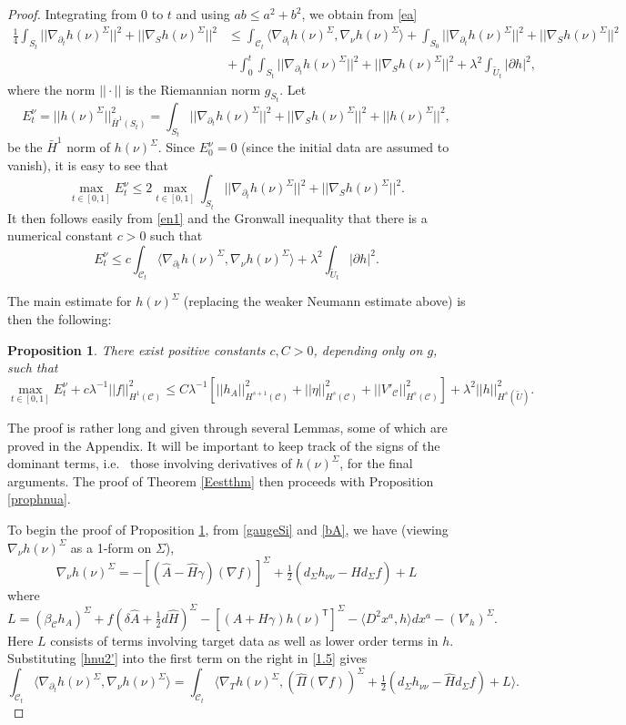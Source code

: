 \documentclass[10pt]{amsart}
\renewcommand{\b}{\beta}
\newcommand{\g}{\gamma}
\renewcommand{\d}{\delta}
\newcommand{\Si}{\Sigma}
\renewcommand{\l}{\lambda}
\newcommand{\cC}{{\mathcal C}}
\newcommand{\tT}{\mathsf{T}}
\newcommand{\be}{\begin{equation}}
\newcommand{\ee}{\end{equation}}
\newcommand{\p}{\partial}
\renewcommand{\hat}{\widehat}
\newcommand{\<}{\langle}
\renewcommand{\>}{\rangle}
\newcommand{\w}{\widetilde}
\theoremstyle{plain}
\newtheorem{proposition}[lemma]{Proposition}
\theoremstyle{remark}
\theoremstyle{definition}
\numberwithin{equation}{section}
\begin{document}
\begin{proof}
 Integrating from $0$ to $t$ and using $ab \leq a^2 + b^2$, we obtain from \eqref{ea} 
\be \label{en1}
\begin{split}
\tfrac{1}{4}\int_{S_t}||\nabla_{\p_t} h(\nu)^{\Si}||^2  +  ||\nabla_S h(\nu)^{\Si}||^2 & \leq \int_{\cC_t}\<\nabla_{\p_t} h(\nu)^{\Si}, \nabla_{\nu}h(\nu)^{\Si}\> 
+ \int_{S_0} ||\nabla_{\p_t} h(\nu)^{\Si}||^2 + ||\nabla_S h(\nu)^{\Si}||^2 \\
& + \int_{0}^t \int_{S_t}||\nabla_{\p_t} h(\nu)^{\Si}||^2 + ||\nabla_S h(\nu)^{\Si}||^2 + \l^2 \int_{\w U_t} |\p h|^2 ,
\end{split}
\ee
where the norm $|| \cdot ||$ is the Riemannian norm $g_{S_t}$. Let 
\be \label{edef}
E_t^{\nu} = ||h(\nu)^{\Si}||_{\bar H^1(S_t)}^2 = \int_{S_t}||\nabla_{\p_t} h(\nu)^{\Si}||^2 + ||\nabla_S h(\nu)^{\Si}||^2 + ||h(\nu)^{\Si}||^2,
\ee
be the $\bar H^1$ norm of $h(\nu)^{\Si}$. Since $E_0^{\nu} = 0$ (since the initial data are assumed to vanish), it is easy to see that 
$$\max_{t\in [0,1]}E_t^{\nu} \leq 2 \max_{t\in [0,1]} \int_{S_t}||\nabla_{\p_t} h(\nu)^{\Si}||^2 + ||\nabla_S h(\nu)^{\Si}||^2.$$ 
It then follows easily from \eqref{en1} and the Gronwall inequality that there is a numerical constant $c > 0$ such that 
\be \label{1.5}
E_t^{\nu} \leq  c \int_{\cC_t}\<\nabla_{\p_t} h(\nu)^{\Si}, \nabla_{\nu}h(\nu)^{\Si}\> + \l^2 \int_{\w U_t} |\p h|^2 .
\ee

   The main estimate for $h(\nu)^{\Si}$ (replacing the weaker Neumann estimate above) is then the following: 
  
 \begin{proposition} \label{mainprop}
 There exist positive constants $c, C > 0$, depending only on $g$, such that 
$$\max_{t\in [0,1]}E_t^{\nu} + c\l^{-1}||f||_{H^1(\cC)}^2 \leq C\l^{-1}[ ||h_A||_{H^{s+1}(\cC)}^2 + ||\eta||_{H^{s}(\cC)}^2 + ||V'_{\cC}||_{H^{s}(\cC)}^2 ] + \l^2  ||h||_{H^s(\w U)}^2.$$
\end{proposition}

   The proof is rather long and given through several Lemmas, some of which are proved in the Appendix. It will be important to keep track of the signs 
of the dominant terms, i.e.~ those involving derivatives of $h(\nu)^{\Si}$, for the final arguments. The proof of Theorem \ref{Eestthm} then proceeds with 
Proposition \ref{prophnua}. 

\smallskip

     To begin the proof of Proposition \ref{mainprop}, from \eqref{gaugeSi} and \eqref{bA}, we have (viewing $\nabla_{\nu}h(\nu)^{\Si}$ as a 1-form on $\Si$), 
\be \label{hnu2'}
\nabla_{\nu}h(\nu)^{\Si} = -[(\hat A - \hat H \g)(\nabla f)]^{\Si} + \tfrac{1}{2}(d_{\Si}h_{\nu \nu} - \hat H d_{\Si}f) + L 
\ee
where
\be \label{Lower}
L = (\b_{\cC}h_A)^{\Si} + f(\d \hat A + \tfrac{1}{2}d\hat H)^{\Si} - [(A+H\g)h(\nu)^{\tT}]^{\Si} - \<D^2 x^a, h\>dx^a - (V'_h)^{\Si}. 
\ee
Here $L$ consists of terms involving target data as well as lower order terms in $h$. 
Substituting \eqref{hnu2'} into the first term on the right in \eqref{1.5} gives 
\be \label{3}
\int_{\cC_t}\<\nabla_{\p_t} h(\nu)^{\Si}, \nabla_{\nu}h(\nu)^{\Si}\> = \int_{\cC_t}\<\nabla_T h(\nu)^{\Si}, (\hat \Pi(\nabla f))^{\Si}  + 
\tfrac{1}{2}(d_{\Si}h_{\nu \nu} - \hat H d_{\Si}f) + L\> .
\ee
  

\end{proof}
\end{document}
